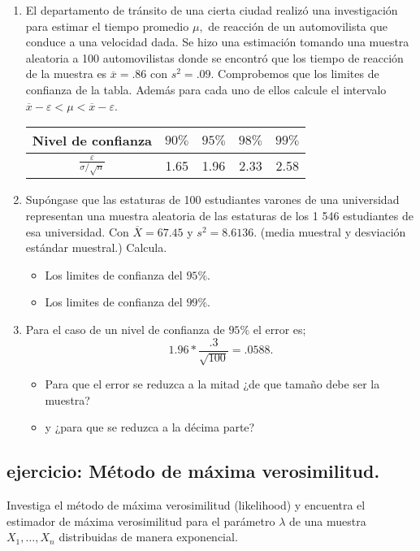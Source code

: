 \documentclass{assignment}
\begin{document}
\begin{enumerate}
	\item El departamento de tránsito de una cierta ciudad realizó una investigación para estimar el tiempo promedio $\mu,$ de reacción de un automovilista que conduce a una velocidad dada. Se hizo una estimación tomando una muestra aleatoria a 100 automovilistas donde se encontró que los tiempo de reacción de la muestra es  $\overline{x}=.86$ con $s^2=.09$. Comprobemos que los limites de confianza de la tabla. Además para cada uno de ellos calcule el intervalo $\overline{x}-\varepsilon < \mu < \overline{x}-\varepsilon$.

\begin{center}
\begin{tabular}{ |c|c|c|c|c| } 
 \hline
 Nivel de confianza & $90 \%$ & $95\%$ & $98\%$ & $99\%$ \\ 
 \hline
 $\frac{\varepsilon }{\sigma/\sqrt{n}}$      & 1.65    & 1.96   & 2.33   & 2.58  \\
 \hline
\end{tabular}
\end{center}


\item Supóngase que las estaturas de 100 estudiantes varones de una universidad representan una muestra aleatoria de las estaturas de los 1 546 estudiantes de esa universidad. Con $\overline{X}=67.45$ y $s^2=8.6136.$ (media muestral y desviación estándar muestral.) Calcula.

\begin{itemize}
    \item Los limites de confianza del $95\%$. 

    \item Los limites de confianza del $99\%$. 
\end{itemize}

	\item Para el caso de un nivel de confianza de $95\%$ el error es; $$1.96*\frac{.3}{\sqrt{100}}= .0588.$$ 
\begin{itemize}
    \item Para que el error se reduzca a la mitad ¿de que tamaño debe ser la muestra?
    \item y ¿para que se reduzca a la décima parte?
\end{itemize}

\end{enumerate}
\subsection{ejercicio: Método de máxima verosimilitud.}
Investiga el método de máxima verosimilitud (likelihood) y encuentra el estimador de máxima verosimilitud para el parámetro $\lambda$ de una muestra $X_1, \dots, X_n$ distribuidas de manera exponencial.
\end{document}
